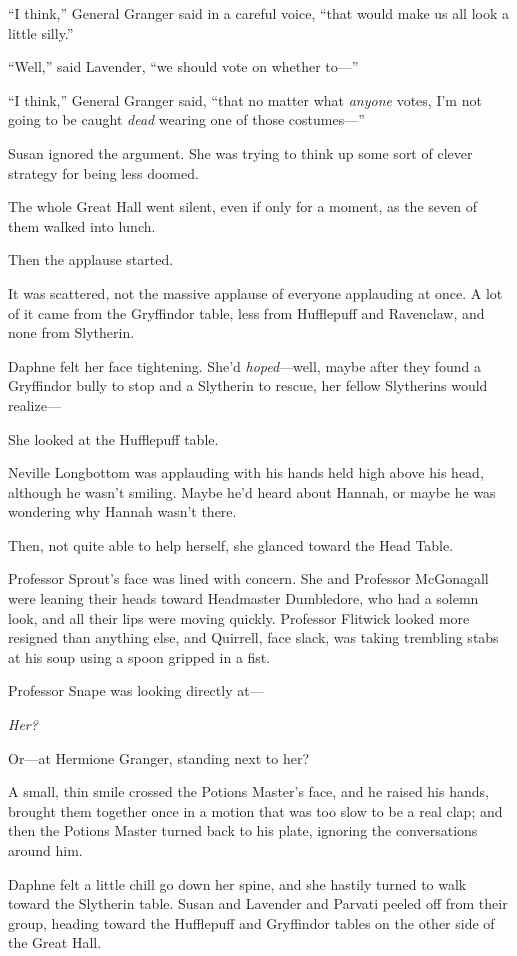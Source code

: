 “I think,” General Granger said in a careful voice, “that would make us all look a little silly.”

“Well,” said Lavender, “we should vote on whether to—”

“I think,” General Granger said, “that no matter what \emph{anyone} votes, I’m not going to be caught \emph{dead} wearing one of those costumes—”

Susan ignored the argument. She was trying to think up some sort of clever strategy for being less doomed.

\later

The whole Great Hall went silent, even if only for a moment, as the seven of them walked into lunch.

Then the applause started.

It was scattered, not the massive applause of everyone applauding at once. A lot of it came from the Gryffindor table, less from Hufflepuff and Ravenclaw, and none from Slytherin.

Daphne felt her face tightening. She’d \emph{hoped}—well, maybe after they found a Gryffindor bully to stop and a Slytherin to rescue, her fellow Slytherins would realize—

She looked at the Hufflepuff table.

Neville Longbottom was applauding with his hands held high above his head, although he wasn’t smiling. Maybe he’d heard about Hannah, or maybe he was wondering why Hannah wasn’t there.

Then, not quite able to help herself, she glanced toward the Head Table.

Professor Sprout’s face was lined with concern. She and Professor McGonagall were leaning their heads toward Headmaster Dumbledore, who had a solemn look, and all their lips were moving quickly. Professor Flitwick looked more resigned than anything else, and Quirrell, face slack, was taking trembling stabs at his soup using a spoon gripped in a fist.

Professor Snape was looking directly at—

\emph{Her?}

Or—at Hermione Granger, standing next to her?

A small, thin smile crossed the Potions Master’s face, and he raised his hands, brought them together once in a motion that was too slow to be a real clap; and then the Potions Master turned back to his plate, ignoring the conversations around him.

Daphne felt a little chill go down her spine, and she hastily turned to walk toward the Slytherin table. Susan and Lavender and Parvati peeled off from their group, heading toward the Hufflepuff and Gryffindor tables on the other side of the Great Hall.

